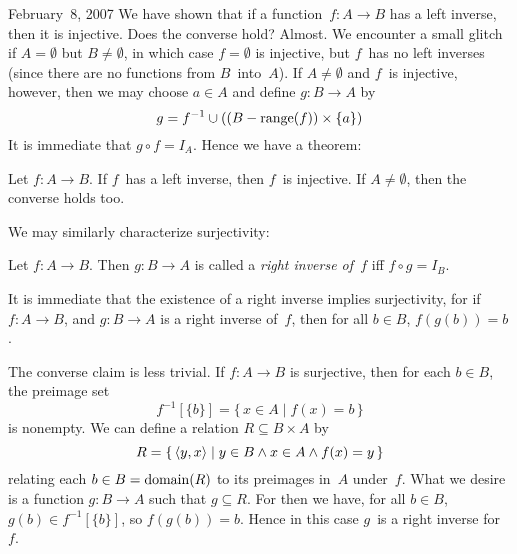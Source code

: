 \begin{lecture}{February~8, 2007}
We have shown that if a function~\(f:A\to B\) has a left inverse, then it is injective. Does the converse hold? Almost. We encounter a small glitch if \(A=\emptyset\) but \(B\ne\emptyset\), in which case \(f=\emptyset\) is injective, but \(f\)~has no left inverses (since there are no functions from \(B\)~into~\(A\)). If \(A\ne\emptyset\) and \(f\)~is injective, however, then we may choose \(a\in A\) and define \(g:B\to A\) by
\[g=f^{-1}\cup((B-\operatorname{range}(f))\times\{a\})\]
It is immediate that \(g\circ f=I_A\). Hence we have a theorem:
\begin{thm}
Let \(f:A\to B\). If \(f\)~has a left inverse, then \(f\)~is injective. If \(A\ne\emptyset\), then the converse holds too.
\end{thm}
We may similarly characterize surjectivity:
\begin{defn}
Let \(f:A\to B\). Then \(g:B\to A\) is called a \emph{right inverse of~\(f\)} iff \(f\circ g=I_B\).
\end{defn}
\noindent It is immediate that the existence of a right inverse implies surjectivity, for if \(f:A\to B\), and \(g:B\to A\) is a right inverse of~\(f\), then for all \(b\in B\), \(f(g(b))=b\).

The converse claim is less trivial. If \(f:A\to B\) is surjective, then for each \(b\in B\), the preimage set
\[f^{-1}[\{b\}]=\{\,x\in A\mid f(x)=b\,\}\]
is nonempty. We can define a relation \(R\subseteq B\times A\) by
\[R=\{\,\langle{y},{x}\rangle\mid y\in B\land x\in A\land f(x)=y\,\}\]
relating each \(b\in B=\operatorname{domain}(R)\) to its preimages in~\(A\) under~\(f\). What we desire is a function \(g:B\to A\) such that \(g\subseteq R\). For then we have, for all \(b\in B\), \(g(b)\in f^{-1}[\{b\}]\), so \(f(g(b))=b\). Hence in this case \(g\)~is a right inverse for~\(f\).


\end{lecture}
